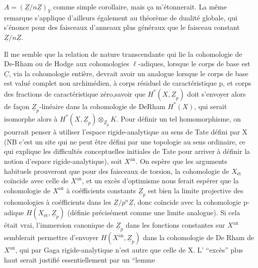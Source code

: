 $A=(\underline Z/n\underline Z)_Y$ comme simple corollaire, mais ça m'étonnerait. La même remarque s'applique d'ailleurs également au théorème de dualité globale, qui s'énonce pour des faisceaux d'anneaux plus généraux que le faisceau constant $\underline Z/n\underline Z$.

Il me semble que la relation de nature transcendante qui lie la cohomologie de De-Rham ou de Hodge aux cohomologies $\ell$-adiques, lorsque le corps de base est $\underline C$, via la cohomologie entière, devrait avoir un analogue lorsque le corps de base est  valué complet non archimédien, à corps résiduel de caractéristique p,  et corps des fractions  de caractéristique zéro,savoir que $H^*(X,\underline Z_p)$ doit s'envoyer alors de façon $\underline Z_p$-linéaire dans la cohomologie de De\unsure{-}Rham $H^*(X)$, qui serait isomorphe alors à $H^*(X,\underline Z_p)\otimes_{\underline Z_p}K$. Pour définir un tel homomorphisme, on pourrait penser à utiliser l'espace rigide-analytique au sens de Tate défini par X (NB c'est un site qui ne peut être défini par une topologie au sens ordinaire, ce qui explique les difficultés conceptuelles initiales de Tate pour arriver à définir la notion d'espace rigide-analytique), soit $X^{\mathrm{an}}$. On espère que les arguments habituels prouveront que pour des faisceaux de torsion, la cohomologie de $X_{\text{ét}}$ coïncide avec celle de $X^{\mathrm{an}}$, et un excès d'optimisme nous ferait espérer que la cohomologie de $X^{\mathrm{an}}$ à coéfficients constants $\underline Z_p$ est bien la limite projective des cohomologies à coéfficients dans les $\underline Z/p^n\underline Z$, donc coïncide avec la cohomologie p-adique $H(X_{\text{ét}},\underline Z_p)$ (définie précisément comme une limite analogue). Si cela était vrai, l'immersion canonique de $\underline Z_p$ dans les fonctions constantes sur $X^{\mathrm{an}}$ semblerait permettre d'envoyer $H(X^{\mathrm{an}},\underline Z_p)$ dans la cohomologie de De Rham de $X^{\mathrm{an}}$, qui par Gaga rigide-analytique n'est autre que celle de X. L' ``excès'' plus haut serait justifié essentiellement par un ``lemme
